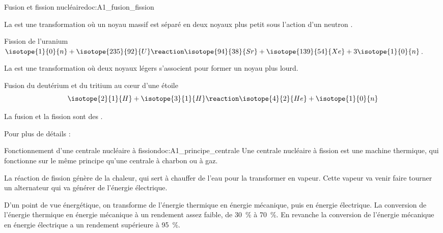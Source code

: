 \begin{doc}{Fusion et fission nucléaire}{doc:A1_fusion_fission}
  \begin{importants}
    La  est une transformation où un noyau massif est séparé en deux noyaux plus petit sous l'action d'un neutron .
  \end{importants}
  \exemple Fission de l'uranium $\isotope{1}{0}{n} + \isotope{235}{92}{U} \reaction \isotope{94}{38}{Sr} + \isotope{139}{54}{Xe} + 3\isotope{1}{0}{n}$.
  
  \begin{importants}
    La  est une transformation où deux noyaux légers s'associent pour former un noyau plus lourd.
  \end{importants}
  \exemple Fusion du deutérium et du tritium au c\oe{}ur d'une étoile
  \begin{equation*}
    \isotope{2}{1}{H} + \isotope{3}{1}{H} \reaction \isotope{4}{2}{He} + \isotope{1}{0}{n}
  \end{equation*}
  
  \phantom{b}\vspace*{-12pt}
  
  \begin{importants}
    La fusion et la fission sont des .
  \end{importants}

  Pour plus de détails :
\end{doc}

\begin{doc}{Fonctionnement d'une centrale nucléaire à fission}{doc:A1_principe_centrale}
  Une centrale nucléaire à fission est une machine thermique, qui fonctionne sur le même principe qu'une centrale à charbon ou à gaz.

  La réaction de fission génère de la chaleur, qui sert à chauffer de l'eau pour la transformer en vapeur.
  Cette vapeur va venir faire tourner un alternateur qui va générer de l'énergie électrique.
  \bigskip

  D'un point de vue énergétique, on transforme de l'énergie thermique en énergie mécanique, puis en énergie électrique.
  La conversion de l'énergie thermique en énergie mécanique à un rendement assez faible, de \qty{30}{\percent} à \qty{70}{\percent}.
  En revanche la conversion de l'énergie mécanique en énergie électrique a un rendement supérieure à \qty{95}{\percent}.
\end{doc}


